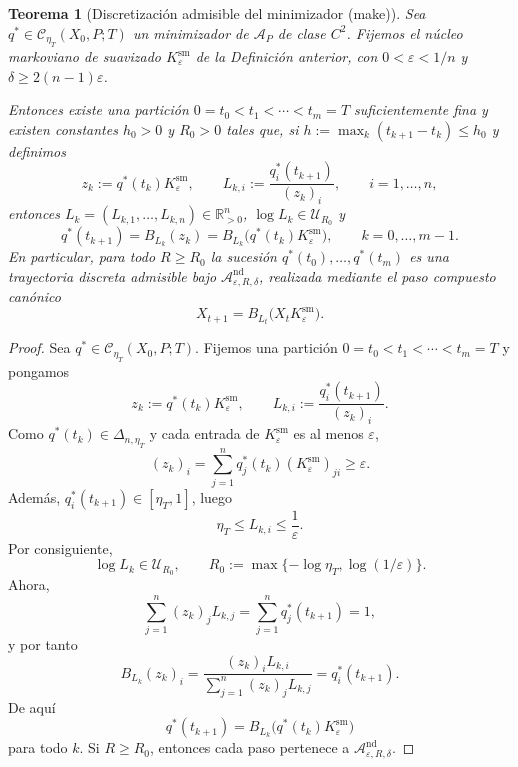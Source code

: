 ﻿\documentclass[12pt]{article}
\newcommand{\fuente}[1]{\textnormal{(#1)}}
\newtheorem{teorema}{Teorema}[section]
\begin{document}
\begin{teorema}[Discretización admisible del minimizador \fuente{make}]
Sea \(q^*\in \mathcal C_{\eta_T}(X_0,P;T)\) un minimizador de \(\mathcal A_P\) de clase \(C^2\). Fijemos el núcleo markoviano de suavizado \(K_\varepsilon^{\mathrm{sm}}\) de la Definición anterior, con \(0<\varepsilon<1/n\) y \(\delta\ge 2(n-1)\varepsilon\).

Entonces existe una partición \(0=t_0<t_1<\cdots<t_m=T\) suficientemente fina y existen constantes \(h_0>0\) y \(R_0>0\) tales que, si \(h:=\max_k(t_{k+1}-t_k)\le h_0\) y definimos
\[
z_k:=q^*(t_k)K_\varepsilon^{\mathrm{sm}},\qquad
L_{k,i}:=\frac{q_i^*(t_{k+1})}{(z_k)_i},\qquad i=1,\dots,n,
\]
entonces \(L_k=(L_{k,1},\dots,L_{k,n})\in\mathbb R_{>0}^n\), \(\log L_k\in\mathcal U_{R_0}\) y
\[
q^*(t_{k+1})=B_{L_k}(z_k)=B_{L_k}\bigl(q^*(t_k)K_\varepsilon^{\mathrm{sm}}\bigr),\qquad k=0,\dots,m-1.
\]
En particular, para todo \(R\ge R_0\) la sucesión \(q^*(t_0),\dots,q^*(t_m)\) es una trayectoria discreta admisible bajo \(\mathcal A_{\varepsilon,R,\delta}^{\mathrm{nd}}\), realizada mediante el paso compuesto canónico
\[
X_{t+1}=B_{L_t}\bigl(X_tK_\varepsilon^{\mathrm{sm}}\bigr).
\]
\end{teorema}
\begin{proof}
Sea \(q^*\in\mathcal C_{\eta_T}(X_0,P;T)\). Fijemos una partición \(0=t_0<t_1<\cdots<t_m=T\) y pongamos
\[
z_k:=q^*(t_k)K_\varepsilon^{\mathrm{sm}},
\qquad
L_{k,i}:=\frac{q_i^*(t_{k+1})}{(z_k)_i}.
\]
Como \(q^*(t_k)\in\Delta_{n,\eta_T}\) y cada entrada de \(K_\varepsilon^{\mathrm{sm}}\) es al menos \(\varepsilon\),
\[
(z_k)_i=\sum_{j=1}^n q_j^*(t_k)(K_\varepsilon^{\mathrm{sm}})_{ji}\ge \varepsilon.
\]
Además, \(q_i^*(t_{k+1})\in[\eta_T,1]\), luego
\[
\eta_T\le L_{k,i}\le \frac1\varepsilon.
\]
Por consiguiente,
\[
\log L_k\in\mathcal U_{R_0},
\qquad
R_0:=\max\{-\log\eta_T,\log(1/\varepsilon)\}.
\]
Ahora,
\[
\sum_{j=1}^n (z_k)_jL_{k,j}
=\sum_{j=1}^n q_j^*(t_{k+1})=1,
\]
y por tanto
\[
B_{L_k}(z_k)_i
=\frac{(z_k)_iL_{k,i}}{\sum_{j=1}^n (z_k)_jL_{k,j}}
=q_i^*(t_{k+1}).
\]
De aquí
\[
q^*(t_{k+1})=B_{L_k}\bigl(q^*(t_k)K_\varepsilon^{\mathrm{sm}}\bigr)
\]
para todo \(k\). Si \(R\ge R_0\), entonces cada paso pertenece a \(\mathcal A_{\varepsilon,R,\delta}^{\mathrm{nd}}\).
\end{proof}
\end{document}
